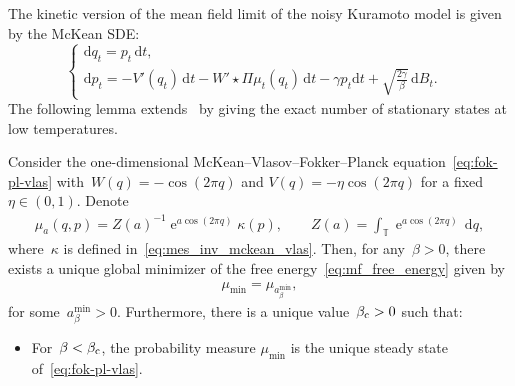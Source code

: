 \documentclass[onefignum,onetabnum]{siamart251216} %
\DeclareMathOperator{\e}{e}
\renewcommand{\d}{\mathrm{d}}
\newcommand{\torus}{\mathbb T}
\newcommand{\mescin}{\mu}
\newcommand{\mesvit}{\kappa}
\newcommand{\projp}{\Pi}
\theoremstyle{plain}
\numberwithin{equation}{section}
\numberwithin{theorem}{section}
\begin{document}
The kinetic version of the mean field limit of the noisy Kuramoto model is given by the McKean SDE:
\[
    \left\{
\begin{array}{ll}
    \d q_t = \displaystyle p_t \,\d t,& \\
    \d p_t = \displaystyle -V'(q_t) \,\d t - W' \star \projp \mescin_t ( q_t)\,\d t -\gamma  p_t \d t +\sqrt{\frac{2\gamma}{\beta}}\,\d B_t.&
\end{array}
    \right.
\]
The following lemma extends~\cite[Lemma 1.26]{delgadino2021diffusive} by giving the exact number of stationary states at low temperatures.
\begin{lemma}
    \label{th:Kuramoto}
    Consider the one-dimensional McKean--Vlasov--Fokker--Planck equation~\eqref{eq:fok-pl-vlas} with~$W(q) = -\cos(2\pi q)$ and $V(q) = -\eta\cos(2\pi q)$ for a fixed~$\eta \in (0,1)$. Denote
    \begin{align*}
        \mu_a(q,p) = Z(a)^{-1} \e^{a\cos(2\pi q)}\mesvit(p), \qquad Z(a) = \int_{\torus}\e^{a\cos(2\pi q)}\,\d q,
    \end{align*}
    where~$\mesvit$ is defined in~\eqref{eq:mes_inv_mckean_vlas}. Then, for any~$\beta >0$, there exists a unique global minimizer of the free energy~\eqref{eq:mf_free_energy} given by
    \begin{align}
            \label{eq:mes_in_kuramoto}
            \mescin_{\min} = \mu_{a_\beta^{\min}},
        \end{align}
    for some~$a_\beta^{\min}>0$.
    Furthermore, there is a unique value~$\beta_{\rm c} > 0$ such that:
    \begin{itemize}
        \item For~$\beta < \beta_{\rm c}$, the probability measure $\mescin_{\min}$ is the unique steady state of~\eqref{eq:fok-pl-vlas}.
        

\end{itemize}
\end{lemma}
\end{document}
